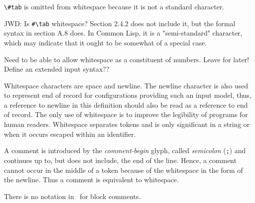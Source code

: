 %
\begin{optPrivate}
    \verb+\#tab+ is omitted from whitespace because it is not a standard
    character.

    JWD: Is \verb+#\tab+ whitespace?  Section 2.4.2 does not include it, but the
    formal syntax in section A.8 does.  In Common Lisp, it is a "semi-standard"
    character, which may indicate that it ought to be somewhat of a special
    case.

    Need to be able to allow whitespace as a constituent of numbers.  Leave for
    later!  Define an extended input syntax??
\end{optPrivate}
%
\begin{optDefinition}
Whitespace characters are space and
newline.  The newline character is also used to represent end of record for
configurations providing such an input model, thus, a reference to newline in
this definition should also be read as a reference to end of record.  The only
use of whitespace is to improve the legibility of programs for human readers.
Whitespace separates tokens and is only significant in a string or when it
occurs escaped within an identifier.

A comment is introduced by the {\em
    comment-begin} glyph,
called {\em semicolon} (\verb+;+) and continues up to, but does not include, the
end of the line.  Hence, a comment cannot occur in the middle of a token because
of the whitespace in the form of the newline.  Thus a comment is equivalent to
whitespace.
%
\begin{note}
    There is no notation in \eulisp\ for block comments.
\end{note}
\end{optDefinition}

